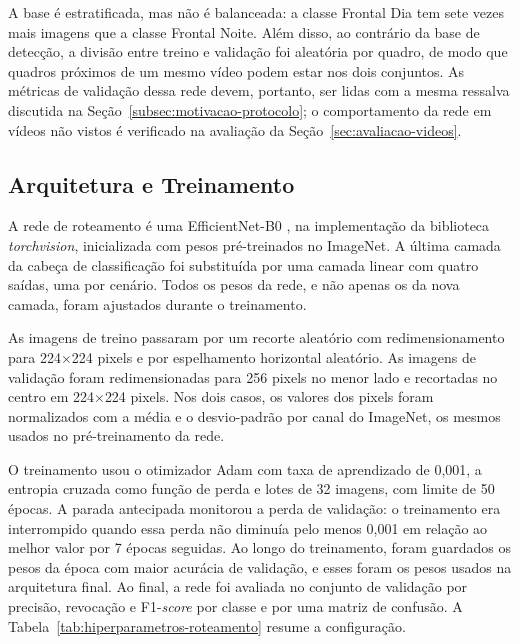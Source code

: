 A base é estratificada, mas não é balanceada: a classe Frontal Dia tem sete vezes mais imagens que a classe Frontal Noite. Além disso, ao contrário da base de detecção, a divisão entre treino e validação foi aleatória por quadro, de modo que quadros próximos de um mesmo vídeo podem estar nos dois conjuntos. As métricas de validação dessa rede devem, portanto, ser lidas com a mesma ressalva discutida na Seção~\ref{subsec:motivacao-protocolo}; o comportamento da rede em vídeos não vistos é verificado na avaliação da Seção~\ref{sec:avaliacao-videos}.

\subsection{Arquitetura e Treinamento}
\label{subsec:treino-roteamento}

A rede de roteamento é uma EfficientNet-B0 \cite{tan2019efficientnet}, na implementação da biblioteca \textit{torchvision}, inicializada com pesos pré-treinados no ImageNet. A última camada da cabeça de classificação foi substituída por uma camada linear com quatro saídas, uma por cenário. Todos os pesos da rede, e não apenas os da nova camada, foram ajustados durante o treinamento.

As imagens de treino passaram por um recorte aleatório com redimensionamento para 224$\times$224 pixels e por espelhamento horizontal aleatório. As imagens de validação foram redimensionadas para 256 pixels no menor lado e recortadas no centro em 224$\times$224 pixels. Nos dois casos, os valores dos pixels foram normalizados com a média e o desvio-padrão por canal do ImageNet, os mesmos usados no pré-treinamento da rede.

O treinamento usou o otimizador Adam \cite{kingma2015adam} com taxa de aprendizado de 0,001, a entropia cruzada como função de perda e lotes de 32 imagens, com limite de 50 épocas. A parada antecipada monitorou a perda de validação: o treinamento era interrompido quando essa perda não diminuía pelo menos 0,001 em relação ao melhor valor por 7 épocas seguidas. Ao longo do treinamento, foram guardados os pesos da época com maior acurácia de validação, e esses foram os pesos usados na arquitetura final. Ao final, a rede foi avaliada no conjunto de validação por precisão, revocação e F1-\textit{score} por classe e por uma matriz de confusão. A Tabela~\ref{tab:hiperparametros-roteamento} resume a configuração.

